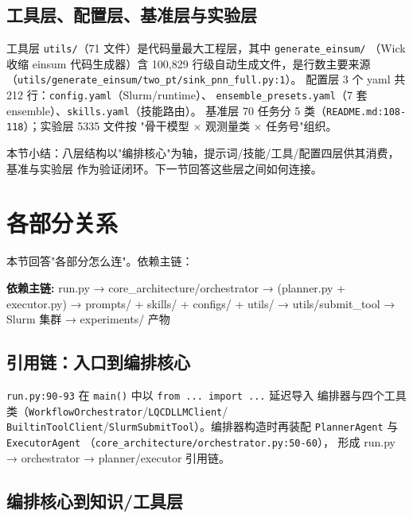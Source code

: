 \documentclass[UTF8]{ctexart}
\begin{document}
\subsection{工具层、配置层、基准层与实验层}

工具层 \texttt{utils/}（71 文件）是代码量最大工程层，其中 \texttt{generate\_einsum/}
（Wick 收缩 einsum 代码生成器）含 100,829 行级自动生成文件，是行数主要来源
（\texttt{\nolinkurl{utils/generate_einsum/two_pt/sink_pnn_full.py:1}}）。
配置层 3 个 yaml 共 212 行：\texttt{config.yaml}（Slurm/runtime）、
\texttt{ensemble\_presets.yaml}（7 套 ensemble）、\texttt{skills.yaml}（技能路由）。
基准层 70 任务分 5 类（\texttt{\nolinkurl{README.md:108-118}}）；实验层 5335 文件按
"骨干模型 $\times$ 观测量类 $\times$ 任务号"组织。

本节小结：八层结构以"编排核心"为轴，提示词/技能/工具/配置四层供其消费，基准与实验层
作为验证闭环。下一节回答这些层之间如何连接。

\section{各部分关系}

本节回答"各部分怎么连"。依赖主链：

\begin{keybox}
\textbf{依赖主链:} \textcolor{relation}{run.py → core\_architecture/orchestrator →
(planner.py + executor.py) → prompts/ + skills/ + configs/ + utils/ →
utils/submit\_tool → Slurm 集群 → experiments/ 产物}
\end{keybox}

\subsection{引用链：入口到编排核心}

\texttt{run.py:90-93} 在 \texttt{main()} 中以 \texttt{from ... import ...} 延迟导入
编排器与四个工具类（\texttt{WorkflowOrchestrator}/\texttt{LQCDLLMClient}/
\texttt{BuiltinToolClient}/\texttt{SlurmSubmitTool}）。编排器构造时再装配
\texttt{PlannerAgent} 与 \texttt{ExecutorAgent}
（\texttt{\nolinkurl{core_architecture/orchestrator.py:50-60}}），
形成 \textcolor{relation}{run.py → orchestrator → planner/executor} 引用链。

\subsection{编排核心到知识/工具层}
\end{document}
